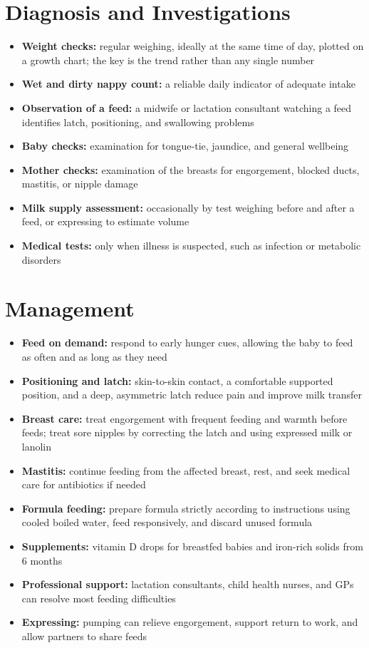 \section*{Diagnosis and Investigations}
\begin{itemize}
    \item \textbf{Weight checks:} regular weighing, ideally at the same time of day, plotted on a growth chart; the key is the trend rather than any single number
    \item \textbf{Wet and dirty nappy count:} a reliable daily indicator of adequate intake
    \item \textbf{Observation of a feed:} a midwife or lactation consultant watching a feed identifies latch, positioning, and swallowing problems
    \item \textbf{Baby checks:} examination for tongue-tie, jaundice, and general wellbeing
    \item \textbf{Mother checks:} examination of the breasts for engorgement, blocked ducts, mastitis, or nipple damage
    \item \textbf{Milk supply assessment:} occasionally by test weighing before and after a feed, or expressing to estimate volume
    \item \textbf{Medical tests:} only when illness is suspected, such as infection or metabolic disorders
\end{itemize}

\section*{Management}
\begin{itemize}
    \item \textbf{Feed on demand:} respond to early hunger cues, allowing the baby to feed as often and as long as they need
    \item \textbf{Positioning and latch:} skin-to-skin contact, a comfortable supported position, and a deep, asymmetric latch reduce pain and improve milk transfer
    \item \textbf{Breast care:} treat engorgement with frequent feeding and warmth before feeds; treat sore nipples by correcting the latch and using expressed milk or lanolin
    \item \textbf{Mastitis:} continue feeding from the affected breast, rest, and seek medical care for antibiotics if needed
    \item \textbf{Formula feeding:} prepare formula strictly according to instructions using cooled boiled water, feed responsively, and discard unused formula
    \item \textbf{Supplements:} vitamin D drops for breastfed babies and iron-rich solids from 6 months
    \item \textbf{Professional support:} lactation consultants, child health nurses, and GPs can resolve most feeding difficulties
    \item \textbf{Expressing:} pumping can relieve engorgement, support return to work, and allow partners to share feeds
\end{itemize}

